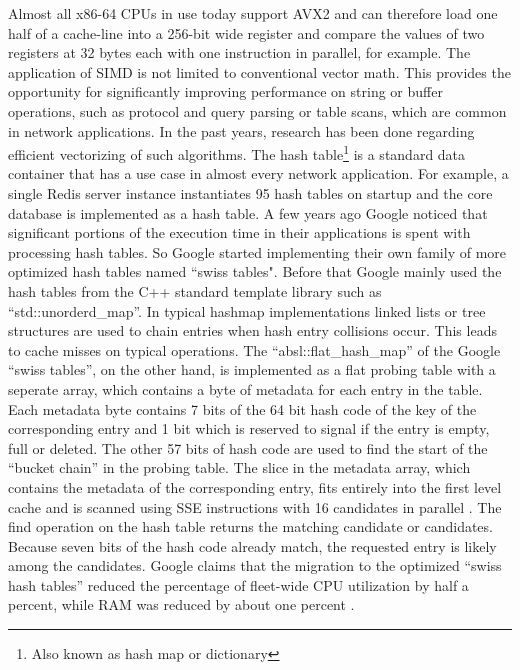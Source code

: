 Almost all x86-64 CPUs in use today support AVX2 and can therefore load one half of a cache-line into a 256-bit wide register and compare the values of two registers at 32 bytes each with one instruction in parallel, for example. The application of SIMD is not limited to conventional vector math. This provides the opportunity for significantly improving performance on string or buffer operations, such as protocol and query parsing or table scans, which are common in network applications. In the past years, research has been done regarding efficient vectorizing of such algorithms. \newline
The hash table\footnote{Also known as hash map or dictionary} is a standard data container that has a use case in almost every network application. For example, a single Redis server instance instantiates 95 hash tables on startup and the core database is implemented as a hash table. \newline
A few years ago Google noticed that significant portions of the execution time in their applications is spent with processing hash tables. So Google started implementing their own family of more optimized hash tables named “swiss tables". Before that Google mainly used the hash tables from the C++ standard template library such as “std::unorderd\_map”. In typical hashmap implementations linked lists or tree structures are used to chain entries when hash entry collisions occur. This leads to cache misses on typical operations. The “absl::flat\_hash\_map” of the Google “swiss tables”, on the other hand, is implemented as a flat probing table with a seperate array, which contains a byte of metadata for each entry in the table. Each metadata byte contains 7 bits of the 64 bit hash code of the key of the corresponding entry and 1 bit which is reserved to signal if the entry is empty, full or deleted. The other 57 bits of hash code are used to find the start of the “bucket chain” in the probing table. The slice in the metadata array, which contains the metadata of the corresponding entry, fits entirely into the first level cache and is scanned using SSE instructions with 16 candidates in parallel \cite{doc:swisstable}. The find operation on the hash table returns the matching candidate or candidates. Because seven bits of the hash code already match, the requested entry is likely among the candidates. Google claims that the migration to the optimized “swiss hash tables” reduced the percentage of fleet-wide CPU utilization by half a percent, while RAM was reduced by about one percent \cite{kulukundis:swisstable}.
